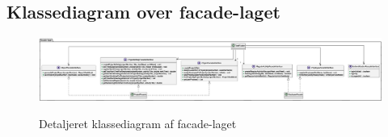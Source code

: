 \begin{landscape}
    \section{Klassediagram over facade-laget}\label{apdx:classDiagram_facade_full}
    \begin{figure}[H]
        \centering
        \caption{Detaljeret klassediagram af facade-laget}
        \includegraphics[width = \linewidth]{ImplementationAndTest/Diagrams/ClassDiagrams/ClassDiagram_facade_full.eps}
        \label{fig:class_facade_full}
    \end{figure}
\end{landscape}